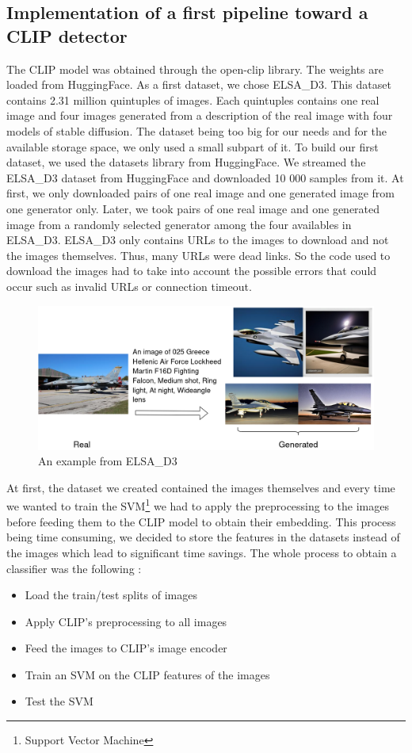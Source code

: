 \documentclass[12pt,a4paper]{article}
\begin{document}
\subsection{Implementation of a first pipeline toward a CLIP detector}
The CLIP model was obtained through the open-clip library. The weights are loaded from HuggingFace. As a first dataset, we chose ELSA\_D3. This dataset contains 2.31 million quintuples of images. Each quintuples contains one real image and four images generated from a description of the real image with four models of stable diffusion. The dataset being too big for our needs and for the available storage space, we only used a small subpart of it. To build our first dataset, we used the datasets library from HuggingFace. We streamed the ELSA\_D3 dataset from HuggingFace and downloaded 10 000 samples from it. At first, we only downloaded pairs of one real image and one generated image from one generator only. Later, we took pairs of one real image and one generated image from a randomly selected generator among the four availables in ELSA\_D3. ELSA\_D3 only contains URLs to the images to download and not the images themselves. Thus, many URLs were dead links. So the code used to download the images had to take into account the possible errors that could occur such as invalid URLs or connection timeout. 

\begin{figure}[H]
    \includegraphics*[width=\textwidth]{img/ELSA.png}
    \caption{An example from ELSA\_D3}
\end{figure}

At first, the dataset we created contained the images themselves and every time we wanted to train the SVM\footnote{Support Vector Machine} we had to apply the preprocessing to the images before feeding them to the CLIP model to obtain their embedding. This process being time consuming, we decided to store the features in the datasets instead of the images which lead to significant time savings. The whole process to obtain a classifier was the following :
\begin{itemize}
    \item Load the train/test splits of images
    \item Apply CLIP's preprocessing to all images
    \item Feed the images to CLIP's image encoder
    \item Train an SVM on the CLIP features of the images
    \item Test the SVM
\end{itemize}
\end{document}
